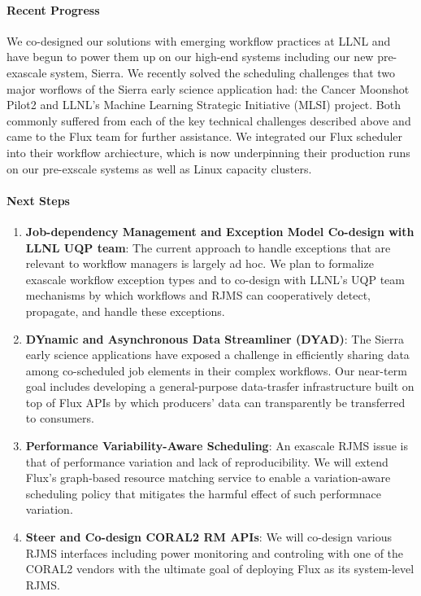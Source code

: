\paragraph{Recent Progress}
We co-designed our solutions with emerging workflow practices at LLNL
and have begun to power them up on our high-end systems including
our new pre-exascale system, Sierra.
We recently solved the scheduling challenges that two major worflows
of the Sierra early science application had:
the Cancer Moonshot Pilot2 and LLNL's
Machine Learning Strategic Initiative (MLSI) project.
Both commonly suffered from each of the key technical challenges described above
and came to the Flux team for further assistance. We integrated
our Flux scheduler into their workflow archiecture, which is now underpinning
their production runs on our pre-exscale systems as well as Linux capacity clusters.

\paragraph{Next Steps}
\begin{enumerate}

    \item {\bf Job-dependency Management and Exception Model Co-design with LLNL UQP team}:
    The current approach to handle exceptions that are relevant to workflow
    managers is largely ad hoc.
    We plan to formalize exascale workflow exception
    types and to co-design with LLNL's UQP team mechanisms by which
    workflows and RJMS can cooperatively
    detect, propagate, and handle these exceptions.

    \item {\bf DYnamic and Asynchronous Data Streamliner (DYAD)}: The Sierra early science
    applications have exposed a challenge in efficiently sharing data among co-scheduled job elements
    in their complex workflows. Our near-term goal includes developing a general-purpose
    data-trasfer infrastructure built on top of Flux APIs
    by which producers' data can transparently be transferred to consumers.

    \item {\bf Performance Variability-Aware Scheduling}: An exascale RJMS issue
    is that of performance variation and lack of reproducibility.
    We will extend Flux’s graph-based resource matching service to enable a variation-aware scheduling
    policy that mitigates the harmful effect of such performnace variation.

    \item {\bf Steer and Co-design CORAL2 RM APIs}: We will co-design various RJMS
    interfaces including power monitoring and controling with
    one of the CORAL2 vendors with the ultimate goal of deploying Flux as its system-level RJMS.

\end{enumerate}

